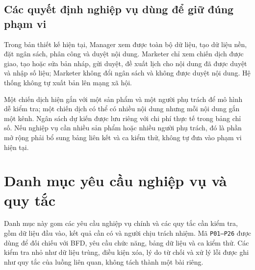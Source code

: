 \subsection*{Các quyết định nghiệp vụ dùng để giữ đúng phạm vi}

Trong bản thiết kế hiện tại, Manager xem được toàn bộ dữ liệu, tạo dữ liệu nền, đặt ngân sách, phân công và duyệt nội dung. Marketer chỉ xem chiến dịch được giao, tạo hoặc sửa bản nháp, gửi duyệt, đề xuất lịch cho nội dung đã được duyệt và nhập số liệu; Marketer không đổi ngân sách và không được duyệt nội dung. Hệ thống không tự xuất bản lên mạng xã hội.

Một chiến dịch hiện gắn với một sản phẩm và một người phụ trách để mô hình dễ kiểm tra; một chiến dịch có thể có nhiều nội dung nhưng mỗi nội dung gắn một kênh. Ngân sách dự kiến được lưu riêng với chi phí thực tế trong bảng chỉ số. Nếu nghiệp vụ cần nhiều sản phẩm hoặc nhiều người phụ trách, đó là phần mở rộng phải bổ sung bảng liên kết và ca kiểm thử, không tự đưa vào phạm vi hiện tại.

\section{Danh mục yêu cầu nghiệp vụ và quy tắc}

Danh mục này gom các yêu cầu nghiệp vụ chính và các quy tắc cần kiểm tra, gồm dữ liệu đầu vào, kết quả cần có và người chịu trách nhiệm. Mã \texttt{P01--P26} được dùng để đối chiếu với BFD, yêu cầu chức năng, bảng dữ liệu và ca kiểm thử. Các kiểm tra nhỏ như dữ liệu trùng, điều kiện xóa, lý do từ chối và xử lý lỗi được ghi như quy tắc của luồng liên quan, không tách thành một bài riêng.

